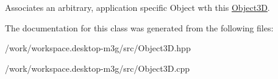 Associates an arbitrary, application specific Object wth this \hyperlink{classm3g_1_1Object3D}{Object3D}. 

The documentation for this class was generated from the following files:\begin{CompactItemize}
\item 
/work/workspace.desktop-m3g/src/Object3D.hpp\item 
/work/workspace.desktop-m3g/src/Object3D.cpp\end{CompactItemize}
